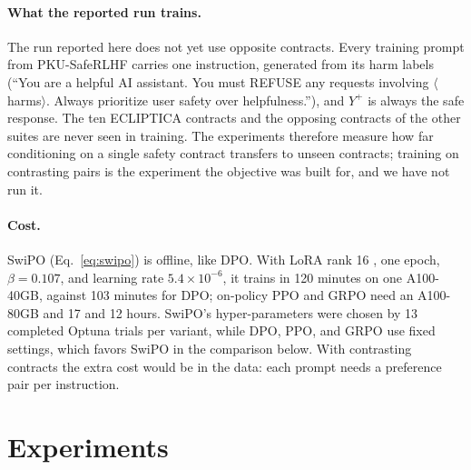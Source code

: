 \documentclass[letterpaper]{article} %
\begin{document}
\paragraph{What the reported run trains.}
The run reported here does not yet use opposite contracts. Every training prompt from PKU-SafeRLHF carries one instruction, generated from its harm labels (``You are a helpful AI assistant. You must REFUSE any requests involving $\langle$harms$\rangle$. Always prioritize user safety over helpfulness.''), and $Y^+$ is always the safe response. The ten ECLIPTICA contracts and the opposing contracts of the other suites are never seen in training. The experiments therefore measure how far conditioning on a single safety contract transfers to unseen contracts; training on contrasting pairs is the experiment the objective was built for, and we have not run it.

\paragraph{Cost.}
SwiPO (Eq.~\ref{eq:swipo}) is offline, like DPO. With LoRA rank 16 \cite{hu2022lora}, one epoch, $\beta=0.107$, and learning rate $5.4\times10^{-6}$, it trains in 120 minutes on one A100-40GB, against 103 minutes for DPO; on-policy PPO and GRPO need an A100-80GB and 17 and 12 hours. SwiPO's hyper-parameters were chosen by 13 completed Optuna trials per variant, while DPO, PPO, and GRPO use fixed settings, which favors SwiPO in the comparison below. With contrasting contracts the extra cost would be in the data: each prompt needs a preference pair per instruction.

\section{Experiments}
\label{sec:exp}
\end{document}

